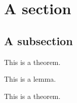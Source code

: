 \documentclass[12pt,a4paper]{article}
\begin{document}
\tableofcontents

\section{A section}

\subsection{A subsection}

\begin{theorem}
  This is a theorem.
\end{theorem}




\begin{lemma}
  This is a lemma.
\end{lemma}

\begin{dang}
  \begin{theorem}
      This is a theorem.
  \end{theorem}
\end{dang}
\end{document}

